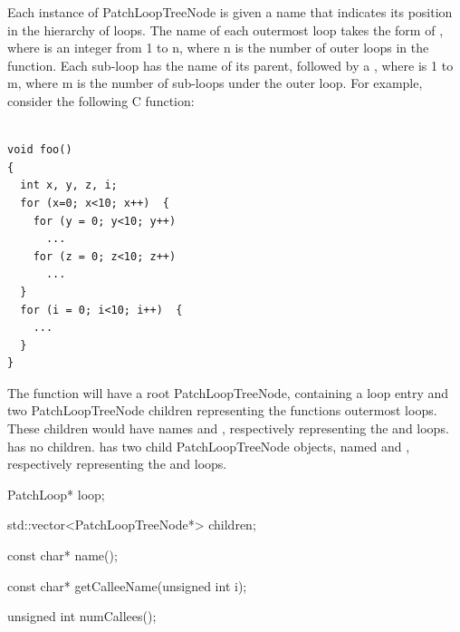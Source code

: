 Each instance of PatchLoopTreeNode is given a name that indicates its position in the hierarchy of loops.
The name of each outermost loop takes the form of ,
where  is an integer from 1 to n,
where n is the number of outer loops in the function.
Each sub-loop has the name of its parent,
followed by a , where  is 1 to m, where m is the number of sub-loops under the outer loop.
For example, consider the following C function:


\begin{lstlisting}

void foo()
{
  int x, y, z, i;
  for (x=0; x<10; x++)  {
    for (y = 0; y<10; y++)
      ...
    for (z = 0; z<10; z++)
      ...
  }
  for (i = 0; i<10; i++)  {
    ...
  }
}
\end{lstlisting}

The  function will have a root PatchLoopTreeNode, containing a  loop entry and
two PatchLoopTreeNode children representing the functions outermost loops. These children
would have names  and , respectively representing the  and  loops.  has
no children.  has two child PatchLoopTreeNode objects, named
 and
, respectively representing the  and  loops.

\begin{apient}
PatchLoop* loop;
\end{apient}

\begin{apient}
std::vector<PatchLoopTreeNode*> children;
\end{apient}

\begin{apient}
const char* name();
\end{apient}

\begin{apient}
const char* getCalleeName(unsigned int i);
\end{apient}

\begin{apient}
unsigned int numCallees();
\end{apient}

